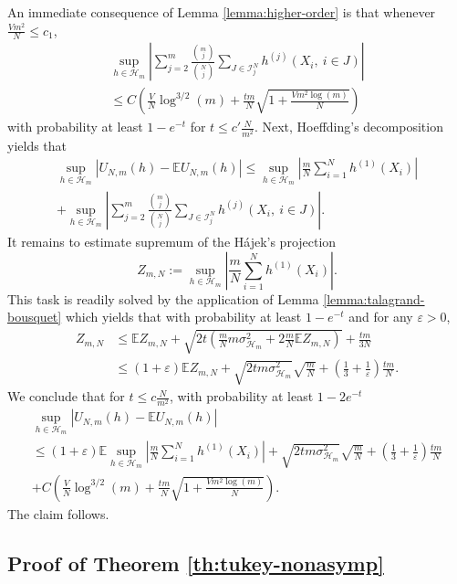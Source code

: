 \documentclass[12pt]{article}
\newcommand{\eps}{\varepsilon}
\def\l{\left}
\def\r{\right}
\newcommand{\m}{\mathcal}
\newcommand{\mb}{\mathbb}
\theoremstyle{thmstyletwo}%
\theoremstyle{thmstylethree}%
\begin{document}
\noindent An immediate consequence of Lemma \ref{lemma:higher-order} is that whenever $\frac{Vm^2}{N}\leq c_1$, 
\begin{multline}
    \label{eq:concentration}
\sup_{h\in \m H_m}\l|\sum_{j=2}^m \frac{{m \choose j}}{{N \choose j}} \sum_{J \in \mathcal{I}^N_j} h^{(j)}\l(X_i,\  i \in J\r)\r|  
\\
\leq C\l( \frac{V}{N}\log^{3/2}(m) + \frac{tm}{N}\sqrt{1+\frac{Vm^2\log(m)}{N}} \r)
\end{multline}
with probability at least $1-e^{-t}$ for $t\leq c'\frac{N}{m^2}$.   
Next, Hoeffding's decomposition yields that 
\begin{multline*}
\sup_{h\in \m H_m} \l| U_{N,m}(h) - \mb E U_{N,m}(h) \r|\leq \sup_{h\in \m H_m}\l|\frac{m}{N} \sum_{i=1}^N h^{(1)}\l(X_i\r)\r|
\\
+\sup_{h\in \m H_m}\l|\sum_{j=2}^m \frac{{m \choose j}}{{N \choose j}} \sum_{J \in \mathcal{I}^N_j} h^{(j)}\l(X_i,\  i \in J\r)\r|.
\end{multline*}
It remains to estimate supremum of the H\'{a}jek's projection 
\[
Z_{m,N}:=\sup_{h\in \m H_m}\l|\frac{m}{N} \sum_{i=1}^N h^{(1)}\l(X_i\r)\r|.
\]
This task is readily solved by the application of Lemma \ref{lemma:talagrand-bousquet} which yields that with probability at least $1-e^{-t}$ and for any $\eps>0$,
\begin{align*}
    Z_{m,N}
    &\leq \mb E Z_{m,N} + \sqrt{2t\l(\frac{m}{N}m\sigma^2_{\m H_m}+2\frac{m}{N}\mb EZ_{m,N}\r)} + \frac{tm}{3N} 
    \\
    &\leq (1+\eps)\mb EZ_{m,N} + \sqrt{2t m\sigma^2_{\m H_m}}\sqrt{\frac{m}{N}} +\l(\frac{1}{3}+\frac{1}{\eps}\r)\frac{tm}{N}. 
\end{align*}
We conclude that for $t\leq c\frac{N}{m^2}$, with probability at least $1-2e^{-t}$ 
\begin{multline*}
    \sup_{h\in \m H_m} \l| U_{N,m}(h) - \mb E U_{N,m}(h) \r| 
    \\
    \leq (1+\eps)\mb E\sup_{h\in \m H_m}\l|\frac{m}{N} \sum_{i=1}^N h^{(1)}\l(X_i\r)\r| + \sqrt{2t m\sigma^2_{\m H_m}}\sqrt{\frac{m}{N}} +\l(\frac{1}{3}+\frac{1}{\eps}\r)\frac{tm}{N}
    \\
    +C\l( \frac{V}{N}\log^{3/2}(m) + \frac{tm}{N}\sqrt{1+\frac{Vm^2\log(m)}{N}} \r).
\end{multline*}
The claim follows. 

\subsection{Proof of Theorem \ref{th:tukey-nonasymp}}
\label{proof:tukey-nonasymp}
\end{document}
